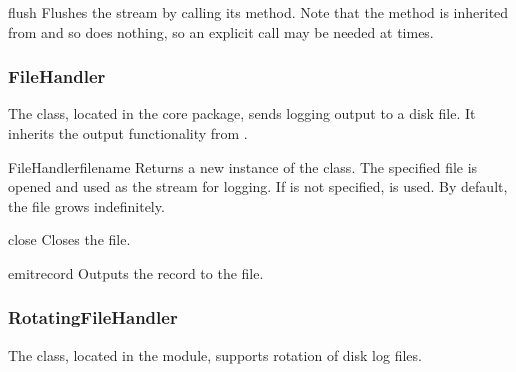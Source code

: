 \begin{methoddesc}{flush}{}
Flushes the stream by calling its  method. Note that
the  method is inherited from  and
so does nothing, so an explicit  call may be needed
at times.
\end{methoddesc}

\subsubsection{FileHandler}

The  class, located in the core 
package, sends logging output to a disk file.  It inherits the output
functionality from .

\begin{classdesc}{FileHandler}{filename}
Returns a new instance of the  class. The specified
file is opened and used as the stream for logging. If  is
not specified,  is used. By default, the file grows
indefinitely.
\end{classdesc}

\begin{methoddesc}{close}{}
Closes the file.
\end{methoddesc}

\begin{methoddesc}{emit}{record}
Outputs the record to the file.
\end{methoddesc}

\subsubsection{RotatingFileHandler}

The  class, located in the 
module, supports rotation of disk log files.

